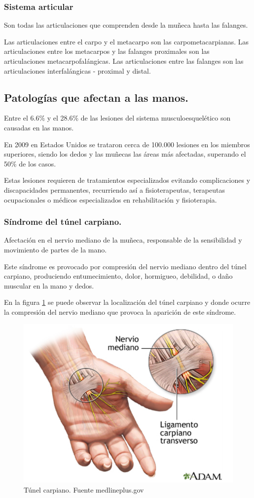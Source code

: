 \subsubsection{Sistema articular}

Son todas las articulaciones que comprenden desde la muñeca hasta las falanges. 

Las articulaciones entre el carpo y el metacarpo son las carpometacarpianas. Las articulaciones entre los metacarpos y las falanges proximales son las articulaciones metacarpofalángicas. Las articulaciones entre las falanges son las articulaciones interfalángicas - proximal y distal. \cite{huesos_mano}
\subsection{Patologías que afectan a las manos.}

Entre el 6.6\% y el 28.6\% de las lesiones del sistema musculoesquelético son causadas en las manos.

En 2009 en Estados Unidos se trataron cerca de 100.000 lesiones en los miembros superiores, siendo los dedos y las muñecas las áreas más afectadas, superando el 50\% de los casos.

Estas lesiones requieren de tratamientos especializados evitando complicaciones y discapacidades permanentes, recurriendo así a fisioterapeutas, terapeutas ocupacionales o médicos especializados en rehabilitación y fisioterapia.  
\cite{arroyo-berezowsky_epidemiology_2021}
\subsubsection{Síndrome del túnel carpiano.}
Afectación en el nervio mediano de la muñeca, responsable de la sensibilidad y movimiento de partes de la mano.

Este síndrome es provocado por compresión del nervio  mediano dentro del túnel carpiano, produciendo entumecimiento, dolor, hormigueo, debilidad, o daño muscular en la mano y dedos. 

En la figura \ref{fig:Tunel_carpiano} se puede observar la localización del túnel carpiano y donde ocurre la compresión del nervio mediano que provoca la aparición de este síndrome. \cite{sindrome_tunel}
\begin{figure}
    \centering
    \includegraphics[width=0.5\linewidth]{img/Tunel_carpiano.png}
    \caption{Túnel carpiano. Fuente medlineplus.gov}
    \label{fig:Tunel_carpiano}
\end{figure}
